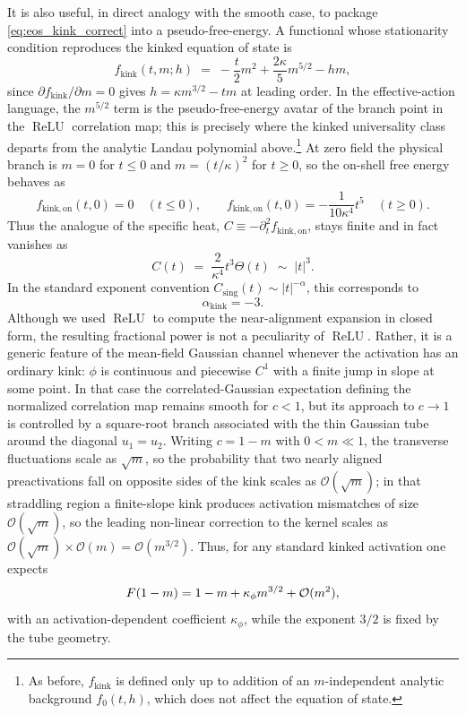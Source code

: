 \documentclass{article}
\DeclareMathOperator{\ReLU}{ReLU}
\newcommand{\relu}{\ensuremath{\ReLU}}
\theoremstyle{plain}
\theoremstyle{definition}
\theoremstyle{remark}
\begin{document}
It is also useful, in direct analogy with the smooth case, to package \eqref{eq:eos_kink_correct} into a pseudo-free-energy.
A functional whose stationarity condition reproduces the kinked equation of state is
\relax
\begin{equation}
f_{\mathrm{kink}}(t,m;h) \;=\; -\frac{t}{2} m^2 + \frac{2\kappa}{5} m^{5/2} - h m,
\label{eq:free_energy_kink}
\end{equation}
\relax
since $\partial f_{\mathrm{kink}}/\partial m=0$ gives $h=\kappa m^{3/2}-tm$ at leading order. In the effective-action language, the \(m^{5/2}\) term is the pseudo-free-energy avatar of the branch point in the \relu{} correlation map; this is precisely where the kinked universality class departs from the analytic Landau polynomial above.\footnote{
As before, $f_{\mathrm{kink}}$ is defined only up to addition of an $m$-independent analytic background $f_0(t,h)$, which does not affect the equation of state.
}
At zero field the physical branch is $m=0$ for $t\le 0$ and $m=(t/\kappa)^2$ for $t\ge 0$, so the on-shell free energy behaves as
\relax
\begin{equation}
f_{\mathrm{kink,on}}(t,0)=0 \quad (t\le 0), \qquad f_{\mathrm{kink,on}}(t,0)=-\frac{1}{10\kappa^{4}} t^{5}\quad (t\ge 0).
\end{equation}
\relax
Thus the analogue of the specific heat, $C\equiv-\partial_t^{2} f_{\mathrm{kink,on}}$, stays finite and in fact vanishes as
\relax
\begin{equation}
C(t)\;=\;\frac{2}{\kappa^{4}} t^{3} \Theta(t)\;\sim\;|t|^{3}.
\end{equation}
\relax
In the standard exponent convention $C_{\mathrm{sing}}(t)\sim |t|^{-\alpha}$, this corresponds to
\relax
\begin{equation}
\alpha_{\mathrm{kink}}=-3.
\end{equation}
\relax
Although we used \relu{} to compute the near-alignment expansion in closed form, the resulting fractional power is not a peculiarity of \relu{}. Rather, it is a generic feature of the mean-field Gaussian channel whenever the activation has an ordinary kink: \(\phi\) is continuous and piecewise \(C^{1}\) with a finite jump in slope at some point. In that case the correlated-Gaussian expectation defining the normalized correlation map remains smooth for \(c<1\), but its approach to \(c\to 1\) is controlled by a square-root branch associated with the thin Gaussian tube around the diagonal \(u_{1}=u_{2}\). Writing \(c=1-m\) with \(0<m\ll 1\), the transverse fluctuations scale as \(\sqrt{m}\), so the probability that two nearly aligned preactivations fall on opposite sides of the kink scales as \(\mathcal O(\sqrt{m})\); in that straddling region a finite-slope kink produces activation mismatches of size \(\mathcal O(\sqrt{m})\), so the leading non-linear correction to the kernel scales as \(\mathcal O(\sqrt{m})\times \mathcal O(m)=\mathcal O(m^{3/2})\). Thus, for any standard kinked activation one expects
\relax
\begin{equation}
F(1-m)=1-m+\kappa_{\phi} m^{3/2}+{\cal O}(m^{2}),
\end{equation}
\relax
with an activation-dependent coefficient \(\kappa_{\phi}\), while the exponent \(3/2\) is fixed by the tube geometry.
\end{document}
